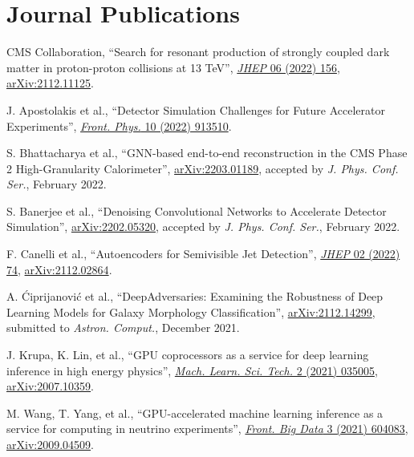 \section{Journal Publications}
\begin{description}[leftmargin=12pt,font=\normalfont,labelsep=0em]
\item CMS Collaboration, ``Search for resonant production of strongly coupled dark matter in proton-proton collisions at 13 TeV'', \href{https://doi.org/10.1007/JHEP06(2022)156}{\emph{JHEP} 06 (2022) 156}, \href{https://arxiv.org/abs/2112.11125}{arXiv:2112.11125}.
\item J. Apostolakis et al., ``Detector Simulation Challenges for Future Accelerator Experiments'', \href{https://doi.org/10.3389/fphy.2022.913510}{\emph{Front. Phys.} 10 (2022) 913510}.
\item \begin{sloppypar}S. Bhattacharya et al., ``GNN-based end-to-end reconstruction in the CMS Phase 2 High-Granularity Calorimeter'', \href{https://arxiv.org/abs/2203.01189}{arXiv:2203.01189}, accepted by \emph{J. Phys. Conf. Ser.}, February 2022.\end{sloppypar}
\item S. Banerjee et al., ``Denoising Convolutional Networks to Accelerate Detector Simulation'', \href{https://arxiv.org/abs/2202.05320}{arXiv:2202.05320}, accepted by \emph{J. Phys. Conf. Ser.}, February 2022.
\item F. Canelli et al., ``Autoencoders for Semivisible Jet Detection'', \href{https://doi.org/10.1007/JHEP02(2022)074}{\emph{JHEP} 02 (2022) 74}, \href{https://arxiv.org/abs/2112.02864}{arXiv:2112.02864}.
\item A. \'Ciprijanovi\'c et al., ``DeepAdversaries: Examining the Robustness of Deep Learning Models for Galaxy Morphology Classification'', \href{https://arxiv.org/abs/2112.14299}{arXiv:2112.14299}, submitted to \emph{Astron. Comput.}, December 2021.
\item J. Krupa, K. Lin, et al., ``GPU coprocessors as a service for deep learning inference in high energy physics'', \href{https://doi.org/10.1088/2632-2153/abec21}{\emph{Mach. Learn. Sci. Tech.} 2 (2021) 035005}, \href{https://arxiv.org/abs/2007.10359}{arXiv:2007.10359}.
\item M. Wang, T. Yang, et al., ``GPU-accelerated machine learning inference as a service for computing in neutrino experiments'', \href{https://doi.org/10.3389/fdata.2020.604083}{\emph{Front. Big Data} 3 (2021) 604083}, \href{https://arxiv.org/abs/2009.04509}{arXiv:2009.04509}.

\end{description}
